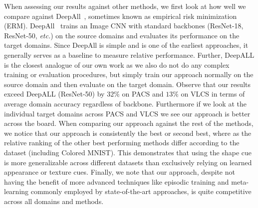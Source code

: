 When assessing our results against other methods, we first look at how well we compare against DeepAll~\cite{Li:etal:ICCV17}, sometimes known as empirical risk minimization (ERM). DeepAll~\cite{Li:etal:ICCV17} trains an Image CNN with standard backbones (ResNet-18, ResNet-50, \emph{etc.}) on the source domains and evaluates its performance on the target domains. Since DeepAll is simple and is  one of the earliest approaches, it generally serves as a baseline to measure relative performance. Further, DeepALL is the closest analogue of our own work as we also do not do any complex training or evaluation procedures, but simply train our approach normally on the source domain and then evaluate on the target domain. Observe that our results exceed DeepALL (ResNet-50) by $32\%$ on PACS and $13\%$ on VLCS in terms of average domain accuracy regardless of backbone. Furthermore if we look at the individual target domains across PACS and VLCS we see our approach is better across the board. When comparing our approach against the rest of the methods, we notice that our approach is consistently the best or second best, where as the relative ranking of the other best performing methods differ according to the dataset (including Colored MNIST). This demonstrates that using the shape cue is more generalizable across different datasets than exclusively relying on learned appearance or texture cues. Finally, we note that our approach, despite not having the benefit of more advanced techniques like episodic training and meta-learning commonly employed by state-of-the-art approaches, is quite competitive across all domains and methods.











































































